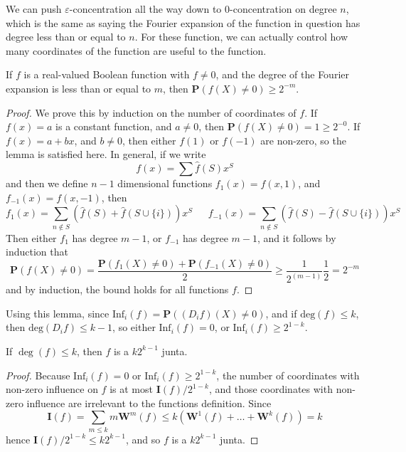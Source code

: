 We can push $\varepsilon$-concentration all the way down to $0$-concentration on degree $n$, which is the same as saying the Fourier expansion of the function in question has degree less than or equal to $n$. For these function, we can actually control how many coordinates of the function are useful to the function.

\begin{lemma}
    If $f$ is a real-valued Boolean function with $f \neq 0$, and the degree of the Fourier expansion is less than or equal to $m$, then $\mathbf{P}(f(X) \neq 0) \geq 2^{-m}$.
\end{lemma}
\begin{proof}
    We prove this by induction on the number of coordinates of $f$. If $f(x) = a$ is a constant function, and $a \neq 0$, then $\mathbf{P}(f(X) \neq 0) = 1 \geq 2^{-0}$. If $f(x) = a + bx$, and $b \neq 0$, then either $f(1)$ or $f(-1)$ are non-zero, so the lemma is satisfied here. In general, if we write
    \[ f(x) = \sum \widehat{f}(S) x^S \]
    and then we define $n-1$ dimensional functions $f_1(x) = f(x,1)$, and $f_{-1}(x) = f(x,-1)$, then
    \[ f_1(x) = \sum_{n \not \in S} \left( \widehat{f}(S) + \widehat{f}(S \cup \{ i \}) \right) x^S\ \ \ \ \ \ \ f_{-1}(x) = \sum_{n \not \in S} \left( \widehat{f}(S) - \widehat{f}(S \cup \{ i \}) \right) x^S \]
    Then either $f_1$ has degree $m-1$, or $f_{-1}$ has degree $m-1$, and it follows by induction that
    \[ \mathbf{P}(f(X) \neq 0) = \frac{\mathbf{P}(f_1(X) \neq 0) + \mathbf{P}(f_{-1}(X) \neq 0)}{2} \geq \frac{1}{2^{(m-1)}} \frac{1}{2} = 2^{-m} \]
    and by induction, the bound holds for all functions $f$.
\end{proof}

Using this lemma, since $\text{Inf}_i(f) = \mathbf{P}((D_if)(X) \neq 0)$, and if $\text{deg}(f) \leq k$, then $\text{deg}(D_if) \leq k-1$, so either $\text{Inf}_i(f) = 0$, or $\text{Inf}_i(f) \geq 2^{1-k}$.

\begin{theorem}
    If $\deg(f) \leq k$, then $f$ is a $k2^{k-1}$ junta.
\end{theorem}
\begin{proof}
    Because $\text{Inf}_i(f) = 0$ or $\text{Inf}_i(f) \geq 2^{1-k}$, the number of coordinates with non-zero influence on $f$ is at most $\mathbf{I}(f)/2^{1-k}$, and those coordinates with non-zero influence are irrelevant to the functions definition. Since
    \[ \mathbf{I}(f) = \sum_{m \leq k} m \mathbf{W}^m(f) \leq k (\mathbf{W}^1(f) + \dots + \mathbf{W}^k(f)) = k \]
    hence $\mathbf{I}(f)/2^{1-k} \leq k2^{k-1}$, and so $f$ is a $k2^{k-1}$ junta.
\end{proof}

